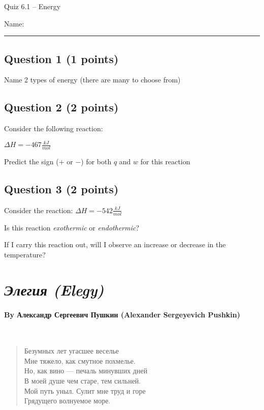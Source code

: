 \documentclass[11pt, letterpaper]{memoir}
\begin{document}
	\begin{center}
		{\large	Quiz 6.1 -- Energy}
	\end{center}
{\large Name: \rule[-1mm]{4in}{.1pt}
	
	\subsection*{Question 1 (1 points)}
	Name 2 types of energy (there are many to choose from)
	
	\vspace{8em}
	\subsection*{Question 2 (2 points)}
	Consider the following reaction:
	
	\noindent
   \hspace{2em} $\Delta H=-467\frac{kJ}{mol}$
	
	\noindent Predict the sign ($+$ or $-$) for both $q$ and $w$ for this reaction
	
	\vspace{8em}
	\subsection*{Question 3 (2 points)}
	Consider the reaction:  \hspace{2em} $\Delta H=-542\frac{kJ}{mol}$
	
	\noindent Is this reaction \emph{exothermic} or \emph{endothermic}?
	
	\vspace{6em}
	\noindent If I carry this reaction out, will I observe an increase or decrease in the temperature?

\newpage
\pagestyle{empty}
\addtocounter{page}{-1}
\section*{\emph{Элегия (Elegy)}}
\paragraph{By Александр Сергеевич Пушкин (Alexander Sergeyevich Pushkin)}~
\begin{verse}
	Безумных лет угасшее веселье\\
	Мне тяжело, как смутное похмелье.\\
	Но, как вино — печаль минувших дней\\
	В моей душе чем старе, тем сильней.\\
	Мой путь уныл. Сулит мне труд и горе\\
	Грядущего волнуемое море.


\end{verse}}
\end{document}
